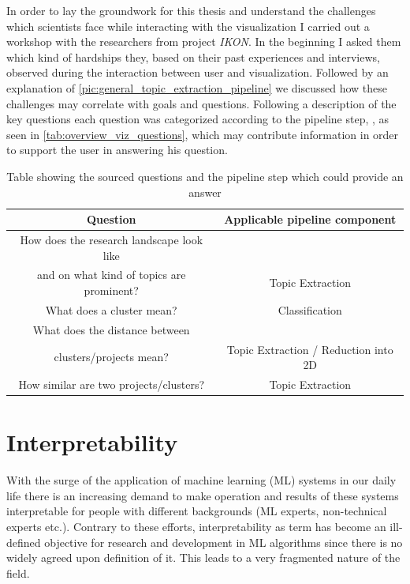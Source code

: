 In order to lay the groundwork for this thesis and understand the challenges which scientists face while interacting with the visualization I carried out a workshop with the researchers from project \textit{IKON}. In the beginning I asked them which kind of hardships they, based on their past experiences and interviews, observed during the interaction between user and visualization. Followed by an explanation of \autoref{pic:general_topic_extraction_pipeline} we discussed how these challenges may correlate with goals and questions. Following a description of the key questions each question was categorized according to the pipeline step, , as seen in \autoref{tab:overview_viz_questions}, which may contribute information in order to support the user in answering his question.

\begin{table}
	\centering
	\begin{tabular}{ c | c }
		\hline 
		Question & Applicable pipeline component \\ \hline
		How does the research landscape look like \\ and on what kind of topics are prominent? & Topic Extraction \\ \hline
		What does a cluster mean? & Classification \\ \hline
		What does the distance between \\ clusters/projects mean? & Topic Extraction / Reduction into 2D \\ \hline
		How similar are two projects/clusters? & Topic Extraction \\
		\hline
	\end{tabular}
	\caption{\label{tab:overview_viz_questions} Table showing the sourced questions and the pipeline step which could provide an answer}
\end{table} 

\section{Interpretability}

With the surge of the application of machine learning (ML) systems in our daily life there is an increasing demand to make operation and results of these systems interpretable for people with different backgrounds (ML experts, non-technical experts etc.). Contrary to these efforts, interpretability as term has become an ill-defined objective \cite{liptonMythosModelInterpretability2016a} for research and development in ML algorithms since there is no widely agreed upon definition of it. This leads to a very fragmented nature of the field. 

